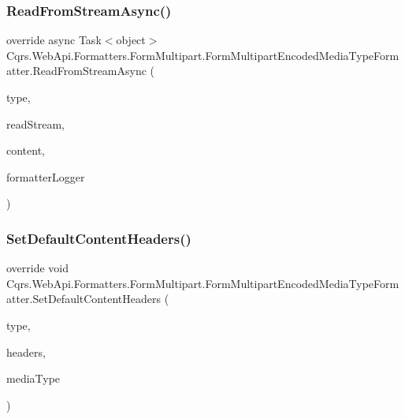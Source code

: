 \subsubsection{\texorpdfstring{Read\+From\+Stream\+Async()}{ReadFromStreamAsync()}}
{\footnotesize\ttfamily override async Task$<$object$>$ Cqrs.\+Web\+Api.\+Formatters.\+Form\+Multipart.\+Form\+Multipart\+Encoded\+Media\+Type\+Formatter.\+Read\+From\+Stream\+Async (\begin{DoxyParamCaption}\item[{Type}]{type,  }\item[{Stream}]{read\+Stream,  }\item[{Http\+Content}]{content,  }\item[{I\+Formatter\+Logger}]{formatter\+Logger }\end{DoxyParamCaption})}

\mbox{\label{classCqrs_1_1WebApi_1_1Formatters_1_1FormMultipart_1_1FormMultipartEncodedMediaTypeFormatter_a181d1b06501e0eda8667c6a4b844400b_a181d1b06501e0eda8667c6a4b844400b}} 
\subsubsection{\texorpdfstring{Set\+Default\+Content\+Headers()}{SetDefaultContentHeaders()}}
{\footnotesize\ttfamily override void Cqrs.\+Web\+Api.\+Formatters.\+Form\+Multipart.\+Form\+Multipart\+Encoded\+Media\+Type\+Formatter.\+Set\+Default\+Content\+Headers (\begin{DoxyParamCaption}\item[{Type}]{type,  }\item[{Http\+Content\+Headers}]{headers,  }\item[{Media\+Type\+Header\+Value}]{media\+Type }\end{DoxyParamCaption})}

